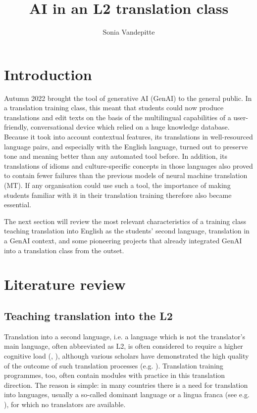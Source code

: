 \documentclass[output=paper]{langscibook}
\author{Sonia Vandepitte\orcid{}\affiliation{Universiteit Gent, Belgium}}
\title{AI in an L2 translation class}
\begin{document}
\maketitle 



\section{Introduction}

Autumn 2022 brought the tool of generative AI (GenAI) to the general public. In a translation training class, this meant that students could now produce translations and edit texts on the basis of the multilingual capabilities of a user-friendly, conversational device which relied on a huge knowledge database. Because it took into account contextual features, its translations in well-resourced language pairs, and especially with the English language, turned out to preserve tone and meaning better than any automated tool before. In addition, its translations of idioms and culture-specific concepts in those languages also proved to contain fewer failures than the previous models of neural machine translation (MT). If any organisation could use such a tool, the importance of making students familiar with it in their translation training therefore also became essential.

The next section will review the most relevant characteristics of a training class teaching translation into English as the students’ second language, translation in a GenAI context, and some pioneering projects that already integrated GenAI into a translation class from the outset.

\section{Literature review}

\subsection{Teaching translation into the L2}

Translation into a second language, i.e. a language which is not the translator’s main language, often abbreviated as L2, is often considered to require a higher cognitive load (\citealt{krings86}, \citealt{gopferich17}), although various scholars have demonstrated the high quality of the outcome of such translation processes (e.g. \cite{grosman00}). Translation training programmes, too, often contain modules with practice in this translation direction. The reason is simple: in many countries there is a need for translation into languages, usually a so-called dominant language or a lingua franca (see e.g. \citealt{h18}), for which no translators are available. 
\end{document}
